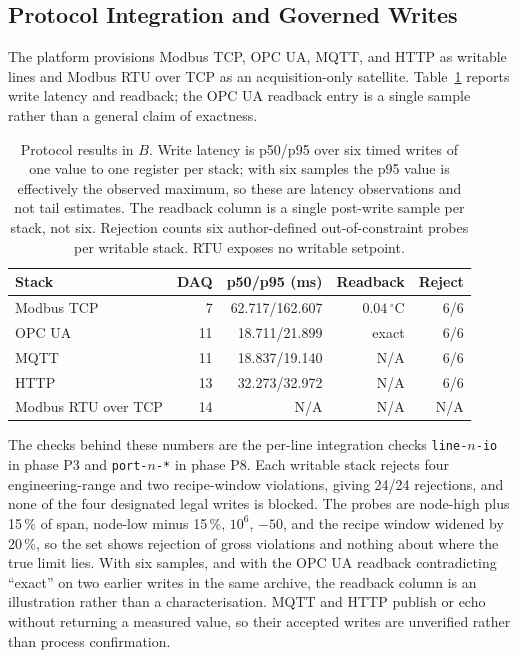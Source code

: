 \subsection{Protocol Integration and Governed Writes}
\label{sec:port}
\label{sec:dynamic}
\label{sec:plc}
\label{sec:govsurface}
The platform provisions Modbus TCP, OPC UA, MQTT, and HTTP as writable lines and
Modbus RTU over TCP as an acquisition-only satellite. Table~\ref{tab:plc} reports write latency and readback; the OPC UA readback entry is a single sample rather than a general claim of exactness.

\begin{table}[!t]
\centering
\caption{Protocol results in $B$. Write latency is p50/p95 over six timed writes
of one value to one register per stack; with six samples the p95 value is
effectively the observed maximum, so these are latency observations and not tail
estimates. The readback column is a single post-write sample per stack, not six.
Rejection counts six author-defined out-of-constraint probes per writable stack.
RTU exposes no writable setpoint.}
\label{tab:plc}
\scriptsize
\setlength{\tabcolsep}{3.4pt}
\begin{tabular}{@{}lrrrr@{}}
\toprule
Stack & DAQ & p50/p95 (ms) & Readback & Reject \\
\midrule
Modbus TCP & 7 & 62.717/162.607 & $0.04\,^\circ$C & 6/6 \\
OPC UA & 11 & 18.711/21.899 & exact & 6/6 \\
MQTT & 11 & 18.837/19.140 & N/A & 6/6 \\
HTTP & 13 & 32.273/32.972 & N/A & 6/6 \\
Modbus RTU over TCP & 14 & N/A & N/A & N/A \\
\bottomrule
\end{tabular}
\end{table}

The checks behind these numbers are the per-line integration checks \texttt{line-$n$-io} in phase P3 and \texttt{port-$n$-*} in phase P8. Each writable stack rejects four engineering-range and two recipe-window
violations, giving 24/24 rejections, and none of the four designated legal writes is blocked.
The probes are node-high plus 15\,\% of span, node-low minus 15\,\%,
$10^{6}$, $-50$, and the recipe window widened by 20\,\%, so the set shows rejection
of gross violations and nothing about where the true limit lies. With six samples,
and with the OPC UA readback contradicting ``exact'' on two earlier writes in the
same archive, the readback column is an illustration rather than a characterisation.
MQTT and HTTP publish or echo without returning a
measured value, so their accepted writes are unverified rather than process
confirmation.

